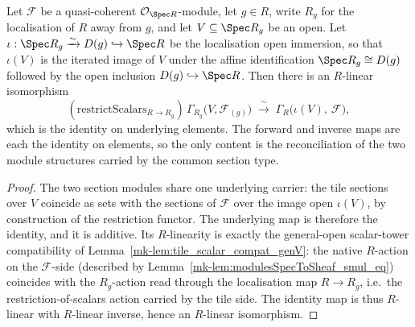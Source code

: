 \begin{lemma}
  \label{mk-lem:tileReconcileEquiv}

  Let \(\mathcal{F}\) be a quasi-coherent \(\mathcal{O}_{\Spec R}\)-module, let \(g \in R\), write \(R_g\)
  for the localisation of \(R\) away from \(g\), and let \(V \subseteq \Spec R_g\) be an open. Let
  \(\iota : \Spec R_g \xrightarrow{\sim} D(g) \hookrightarrow \Spec R\) be the localisation open
  immersion, so that \(\iota(V)\) is the iterated image of \(V\) under the affine identification
  \(\Spec R_g \cong D(g)\) followed by the open inclusion \(D(g) \hookrightarrow \Spec R\). Then there is
  an \(R\)-linear isomorphism
  \[
    (\mathrm{restrictScalars}_{R \to R_g})\, \Gamma_{R_g}\bigl(V, \mathcal{F}_{(g)}\bigr)
      \;\xrightarrow{\ \sim\ }\;
      \Gamma_R\bigl(\iota(V),\ \mathcal{F}\bigr),
  \]
  which is the identity on underlying elements. The forward and inverse maps are each the identity on
  elements, so the only content is the reconciliation of the two module structures carried by the
  common section type.
\end{lemma}
\begin{proof}
  The two section modules share one underlying carrier: the tile sections over \(V\) coincide as
  sets with the sections of \(\mathcal{F}\) over the image open \(\iota(V)\), by construction of the
  restriction functor. The underlying map is therefore the identity, and it is additive. Its \(R\)-linearity is
  exactly the general-open scalar-tower compatibility of Lemma~\ref{mk-lem:tile_scalar_compat_genV}: the
  native \(R\)-action on the \(\mathcal{F}\)-side (described by
  Lemma~\ref{mk-lem:modulesSpecToSheaf_smul_eq}) coincides with the \(R_g\)-action read through the
  localisation map \(R \to R_g\), i.e.\ the restriction-of-scalars action carried by the tile side. The
  identity map is thus \(R\)-linear with \(R\)-linear inverse, hence an \(R\)-linear isomorphism.
\end{proof}

